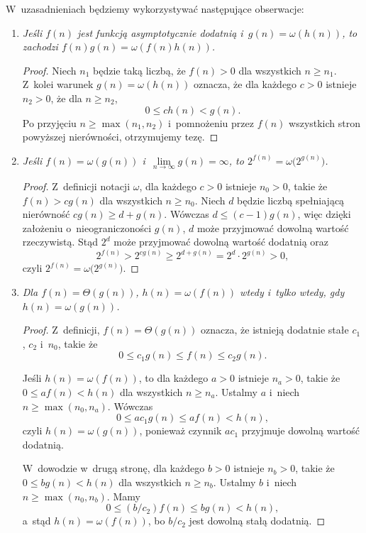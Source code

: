 
\subproblem %
W~uzasadnieniach będziemy wykorzystywać następujące obserwacje:
\begin{enumerate}[({O}1)]
	\item \textit{Jeśli\/ $f(n)$ jest funkcją asymptotycznie dodatnią i\/~$g(n)=\omega(h(n))$, to zachodzi\/ $f(n)g(n)=\omega(f(n)h(n))$.}
	\begin{proof}
		Niech $n_1$ będzie taką liczbą, że $f(n)>0$ dla wszystkich $n\ge n_1$.
		Z~kolei warunek $g(n)=\omega(h(n))$ oznacza, że dla każdego $c>0$ istnieje $n_2>0$, że dla $n\ge n_2$,
		\[
			0 \le ch(n) < g(n).
		\]
		Po przyjęciu $n\ge\max(n_1,n_2)$ i~pomnożeniu przez $f(n)$ wszystkich stron powyższej nierówności, otrzymujemy tezę.
	\end{proof}
	\item \textit{Jeśli\/ $f(n)=\omega(g(n))$ i\/~$\lim\limits_{n\to\infty}g(n)=\infty$, to\/ $2^{f(n)}=\omega\bigl(2^{g(n)}\bigr)$.}
	\begin{proof}
		Z~definicji notacji $\omega$, dla każdego $c>0$ istnieje $n_0>0$, takie że $f(n)>cg(n)$ dla wszystkich $n\ge n_0$.
		Niech $d$ będzie liczbą spełniającą nierówność $cg(n)\ge d+g(n)$.
		Wówczas $d\le(c-1)g(n)$, więc dzięki założeniu o~nieograniczoności $g(n)$, $d$ może przyjmować dowolną wartość rzeczywistą.
		Stąd $2^d$ może przyjmować dowolną wartość dodatnią oraz
		\[
			2^{f(n)} > 2^{cg(n)} \ge 2^{d+g(n)} = 2^d\cdot2^{g(n)} > 0,
		\]
		czyli $2^{f(n)}=\omega\bigl(2^{g(n)}\bigr)$.
	\end{proof}
	\item \textit{Dla\/ $f(n)=\Theta(g(n))$,\/ $h(n)=\omega(f(n))$ wtedy i~tylko wtedy, gdy\/ $h(n)=\omega(g(n))$.}
	\begin{proof}
		Z~definicji, $f(n)=\Theta(g(n))$ oznacza, że istnieją dodatnie stałe $c_1$, $c_2$ i~$n_0$, takie że
		\[
			0 \le c_1g(n) \le f(n) \le c_2g(n).
		\]

		Jeśli $h(n)=\omega(f(n))$, to dla każdego $a>0$ istnieje $n_a>0$, takie że $0\le af(n)<h(n)$ dla wszystkich $n\ge n_a$.
		Ustalmy $a$ i~niech $n\ge\max(n_0,n_a)$.
		Wówczas
		\[
			0 \le ac_1g(n) \le af(n) < h(n),
		\]
		czyli $h(n)=\omega(g(n))$, ponieważ czynnik $ac_1$ przyjmuje dowolną wartość dodatnią.

		W~dowodzie w~drugą stronę, dla każdego $b>0$ istnieje $n_b>0$, takie że $0\le bg(n)<h(n)$ dla wszystkich $n\ge n_b$.
		Ustalmy $b$ i~niech $n\ge\max(n_0,n_b)$.
		Mamy
		\[
			0 \le (b/c_2)f(n) \le bg(n) < h(n),
		\]
		a~stąd $h(n)=\omega(f(n))$, bo $b/c_2$ jest dowolną stałą dodatnią.
	\end{proof}
\end{enumerate}

